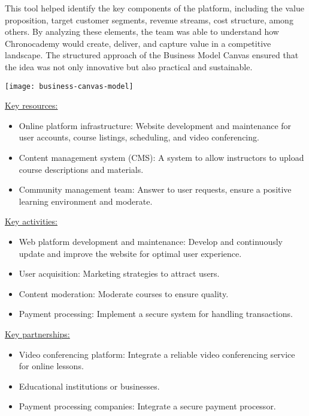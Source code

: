 This tool helped identify the key components of the platform, including the value proposition, target customer segments, revenue streams, cost structure, among others.
By analyzing these elements, the team was able to understand how Chronocademy would create, deliver, and capture value in a competitive landscape.
The structured approach of the Business Model Canvas ensured that the idea was not only innovative but also practical and sustainable.

\texttt{[image: business-canvas-model]}

\underline{Key resources:}
\begin{itemize}
\item Online platform infrastructure: Website development and maintenance for user accounts, course listings, scheduling, and video conferencing.
\item Content management system (CMS): A system to allow instructors to upload course descriptions and materials.
\item Community management team: Answer to user requests, ensure a positive learning environment and moderate.
\end{itemize}

\underline{Key activities:}
\begin{itemize}
\item Web platform development and maintenance: Develop and continuously update and improve the website for optimal user experience.
\item User acquisition: Marketing strategies to attract users.
\item Content moderation: Moderate courses to ensure quality.
\item Payment processing: Implement a secure system for handling transactions.
\end{itemize}

\underline{Key partnerships:}
\begin{itemize}
\item Video conferencing platform: Integrate a reliable video conferencing service for online lessons.
\item Educational institutions or businesses.
\item Payment processing companies: Integrate a secure payment processor.
\end{itemize}


